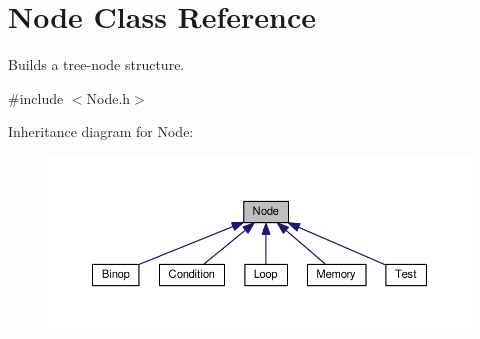 \hypertarget{classNode}{}\section{Node Class Reference}
\label{classNode}


Builds a tree-\/node structure.  




{\ttfamily \#include $<$Node.\+h$>$}



Inheritance diagram for Node\+:\nopagebreak
\begin{figure}[H]
\begin{center}
\leavevmode
\includegraphics[width=350pt]{classNode__inherit__graph}
\end{center}
\end{figure}
